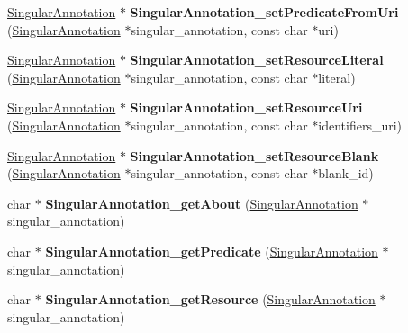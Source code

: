 \begin{DoxyCompactItemize}
\item 
\mbox{\label{namespaceomexmeta_abea6cebaf66d178b8cca6dd636bd47d0}} 
\hyperlink{classomexmeta_1_1Triple}{Singular\+Annotation} $\ast$ {\bfseries Singular\+Annotation\+\_\+set\+Predicate\+From\+Uri} (\hyperlink{classomexmeta_1_1Triple}{Singular\+Annotation} $\ast$singular\+\_\+annotation, const char $\ast$uri)
\item 
\mbox{\label{namespaceomexmeta_a6b829135446cd1744f20a1ce3e8e4215}} 
\hyperlink{classomexmeta_1_1Triple}{Singular\+Annotation} $\ast$ {\bfseries Singular\+Annotation\+\_\+set\+Resource\+Literal} (\hyperlink{classomexmeta_1_1Triple}{Singular\+Annotation} $\ast$singular\+\_\+annotation, const char $\ast$literal)
\item 
\mbox{\label{namespaceomexmeta_ab3fbe78f87d3275c23f10712b1a77f87}} 
\hyperlink{classomexmeta_1_1Triple}{Singular\+Annotation} $\ast$ {\bfseries Singular\+Annotation\+\_\+set\+Resource\+Uri} (\hyperlink{classomexmeta_1_1Triple}{Singular\+Annotation} $\ast$singular\+\_\+annotation, const char $\ast$identifiers\+\_\+uri)
\item 
\mbox{\label{namespaceomexmeta_a72ef479adb05bad7b91b332fbbc3c886}} 
\hyperlink{classomexmeta_1_1Triple}{Singular\+Annotation} $\ast$ {\bfseries Singular\+Annotation\+\_\+set\+Resource\+Blank} (\hyperlink{classomexmeta_1_1Triple}{Singular\+Annotation} $\ast$singular\+\_\+annotation, const char $\ast$blank\+\_\+id)
\item 
\mbox{\label{namespaceomexmeta_aa2be46b784b2c7840ae58087bfeccd68}} 
char $\ast$ {\bfseries Singular\+Annotation\+\_\+get\+About} (\hyperlink{classomexmeta_1_1Triple}{Singular\+Annotation} $\ast$singular\+\_\+annotation)
\item 
\mbox{\label{namespaceomexmeta_af1fb5e2e7cad553b230addfb56a8bdbf}} 
char $\ast$ {\bfseries Singular\+Annotation\+\_\+get\+Predicate} (\hyperlink{classomexmeta_1_1Triple}{Singular\+Annotation} $\ast$singular\+\_\+annotation)
\item 
\mbox{\label{namespaceomexmeta_a886b19fc7c95cebd0a82ae2c9f36ab68}} 
char $\ast$ {\bfseries Singular\+Annotation\+\_\+get\+Resource} (\hyperlink{classomexmeta_1_1Triple}{Singular\+Annotation} $\ast$singular\+\_\+annotation)

\end{DoxyCompactItemize}
